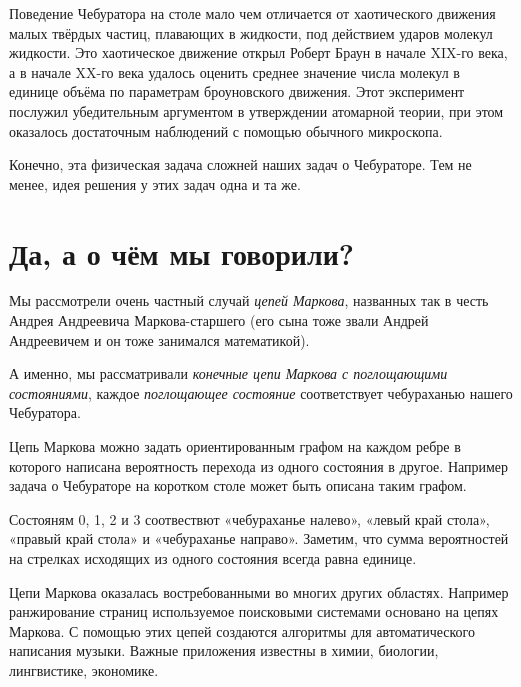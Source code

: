 \documentclass{article}
\begin{document}
Поведение Чебуратора на столе мало чем отличается 
от хаотического движения малых твёрдых частиц, плавающих в жидкости, под действием ударов молекул жидкости. 
Это хаотическое движение открыл Роберт Браун в начале XIX-го века, а в начале XX-го века удалось оценить
среднее значение числа молекул в единице объёма по параметрам броуновского движения.
Этот эксперимент послужил убедительным аргументом в утверждении атомарной теории, при этом оказалось достаточным
наблюдений с помощью обычного микроскопа.

Конечно, эта физическая задача сложней наших задач о Чебураторе.
Тем не менее, идея решения у этих задач одна и та же.



\section{Да, а о чём мы говорили?}

Мы рассмотрели очень частный случай \emph{цепей Маркова},
названных так в честь Андрея Андреевича Маркова-старшего (его сына тоже звали Андрей Андреевичем и он тоже занимался математикой).

А именно, мы рассматривали \emph{конечные цепи Маркова с поглощающими состояниями},
каждое \emph{поглощающее состояние} соответствует чебураханью нашего Чебуратора.

Цепь Маркова можно задать ориентированным графом 
на каждом ребре в которого написана вероятность перехода из одного состояния в другое.
Например задача о Чебураторе на коротком столе может быть описана таким графом.
\smallskip
\begin{center}
\end{center}
\smallskip
Состояням 0, 1, 2 и 3 соотвествют «чебураханье налево», «левый край стола», «правый край стола» и «чебураханье направо».
Заметим, что сумма вероятностей на стрелках исходящих из одного состояния всегда равна единице.

Цепи Маркова оказалась востребованными во многих других областях.
Например ранжирование страниц используемое поисковыми системами основано на цепях Маркова.
С помощью этих цепей создаются алгоритмы для автоматического написания музыки.
Важные приложения известны в химии, биологии, лингвистике, экономике.
\end{document}

